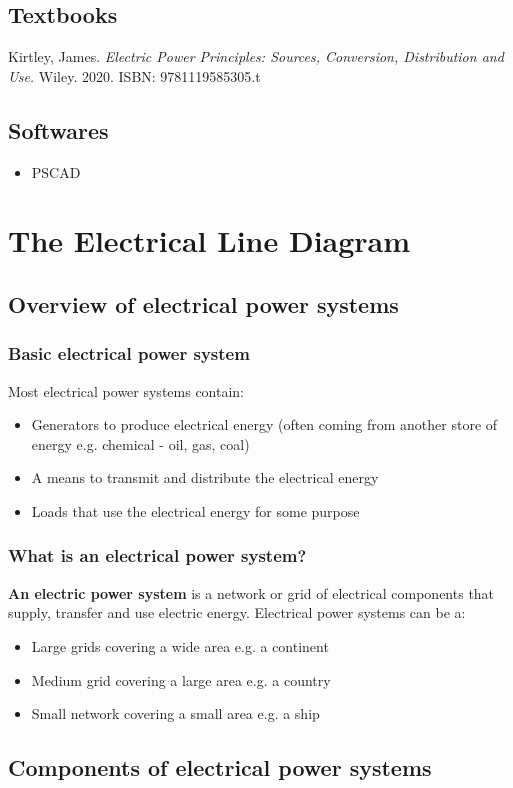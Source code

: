 \section{Textbooks}
Kirtley, James. \textit{Electric Power Principles: Sources, Conversion, Distribution and Use.} Wiley. 2020. ISBN: 9781119585305.t
\section{Softwares}
\begin{itemize}
	\item PSCAD
\end{itemize}
\chapter{The Electrical Line Diagram}
\section{Overview of electrical power systems}
\subsection{Basic electrical power system}
Most electrical power systems contain:
\begin{itemize}
	\item Generators to produce electrical energy (often coming from another store of energy e.g. chemical - oil, gas, coal)
	\item A means to transmit and distribute the electrical energy
	\item Loads that use the electrical energy for some purpose
\end{itemize}
\subsection{What is an electrical power system?}
\textbf{An electric power system} is a network or grid of electrical components that supply, transfer and use electric energy. Electrical power systems can be a:
\begin{itemize}
	\item Large grids covering a wide area e.g. a continent
	\item Medium grid covering a large area e.g. a country
	\item Small network covering a small area e.g. a ship
\end{itemize}
\section{Components of electrical power systems}
